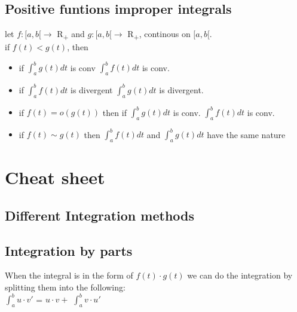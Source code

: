 \documentclass{article}
\begin{document}
\subsection{Positive funtions improper integrals}
let $f: [ a, b [ \rightarrow $ R\textsubscript{+} and $g: [ a, b [ \rightarrow $ R\textsubscript{+}, continous on $ [a, b [ $.\\
if $f(t) < g(t)$, then\\
\begin{itemize}
    \item if $\int _ { a } ^ { b } g ( t ) d t$ is conv \Rightarrow $\int _ { a } ^ { b } f ( t ) d t$ is conv.\\ 
    \item if $\int _ { a } ^ { b } f ( t ) d t$ is divergent \Rightarrow $\int _ { a } ^ { b } g ( t ) d t$ is divergent.\\
    \item if $f(t) =  o (g(t)) $ then if $\int _ { a } ^ { b } g ( t ) d t$ is conv. \Rightarrow $\int _ { a } ^ { b } f ( t ) d t$ is conv.\\
    \item if $f(t) \sim g(t) $ then $\int _ { a } ^ { b } f ( t ) d t$ and $\int _ { a } ^ { b } g ( t ) d t $ have the same nature\\ 
\end{itemize}
\section{Cheat sheet}
\subsection{Different Integration methods}
\subsection{Integration by parts}
When the integral is in the form of $f(t)\cdot g(t)$ we can do the integration by splitting them into the following:\\
$\int_{a}^{b} u \cdot v'$ = $u\cdot v + $ $\int_{a}^{b} v\cdot u'$\\
\end{document}
